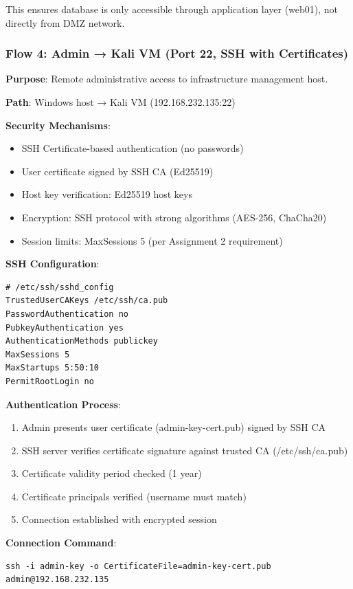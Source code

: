 This ensures database is only accessible through application layer (web01), not directly from DMZ network.

\subsubsection{Flow 4: Admin → Kali VM (Port 22, SSH with Certificates)}

\textbf{Purpose}: Remote administrative access to infrastructure management host.

\textbf{Path}: Windows host → Kali VM (192.168.232.135:22)

\textbf{Security Mechanisms}:
\begin{itemize}
    \item SSH Certificate-based authentication (no passwords)
    \item User certificate signed by SSH CA (Ed25519)
    \item Host key verification: Ed25519 host keys
    \item Encryption: SSH protocol with strong algorithms (AES-256, ChaCha20)
    \item Session limits: MaxSessions 5 (per Assignment 2 requirement)
\end{itemize}

\textbf{SSH Configuration}:
\begin{verbatim}
# /etc/ssh/sshd_config
TrustedUserCAKeys /etc/ssh/ca.pub
PasswordAuthentication no
PubkeyAuthentication yes
AuthenticationMethods publickey
MaxSessions 5
MaxStartups 5:50:10
PermitRootLogin no
\end{verbatim}

\textbf{Authentication Process}:
\begin{enumerate}
    \item Admin presents user certificate (admin-key-cert.pub) signed by SSH CA
    \item SSH server verifies certificate signature against trusted CA (/etc/ssh/ca.pub)
    \item Certificate validity period checked (1 year)
    \item Certificate principals verified (username must match)
    \item Connection established with encrypted session
\end{enumerate}

\textbf{Connection Command}:
\begin{verbatim}
ssh -i admin-key -o CertificateFile=admin-key-cert.pub admin@192.168.232.135
\end{verbatim}

